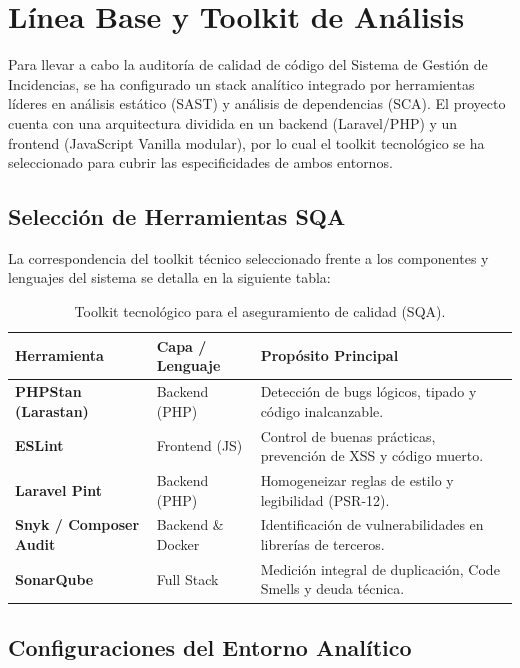 \section{Línea Base y Toolkit de Análisis}

Para llevar a cabo la auditoría de calidad de código del Sistema de Gestión de Incidencias, se ha configurado un stack analítico integrado por herramientas líderes en análisis estático (SAST) y análisis de dependencias (SCA). El proyecto cuenta con una arquitectura dividida en un backend (Laravel/PHP) y un frontend (JavaScript Vanilla modular), por lo cual el toolkit tecnológico se ha seleccionado para cubrir las especificidades de ambos entornos.

\subsection{Selección de Herramientas SQA}

La correspondencia del toolkit técnico seleccionado frente a los componentes y lenguajes del sistema se detalla en la siguiente tabla:

\begin{table}[h]
\centering
\begin{tabularx}{\textwidth}{|l|l|X|}
\hline
\textbf{Herramienta} & \textbf{Capa / Lenguaje} & \textbf{Propósito Principal} \\ \hline
\textbf{PHPStan (Larastan)} & Backend (PHP) & Detección de bugs lógicos, tipado y código inalcanzable. \\ \hline
\textbf{ESLint} & Frontend (JS) & Control de buenas prácticas, prevención de XSS y código muerto. \\ \hline
\textbf{Laravel Pint} & Backend (PHP) & Homogeneizar reglas de estilo y legibilidad (PSR-12). \\ \hline
\textbf{Snyk / Composer Audit} & Backend \& Docker & Identificación de vulnerabilidades en librerías de terceros. \\ \hline
\textbf{SonarQube} & Full Stack & Medición integral de duplicación, Code Smells y deuda técnica. \\ \hline
\end{tabularx}
\caption{Toolkit tecnológico para el aseguramiento de calidad (SQA).}
\label{tab:toolkit}
\end{table}

\subsection{Configuraciones del Entorno Analítico}

